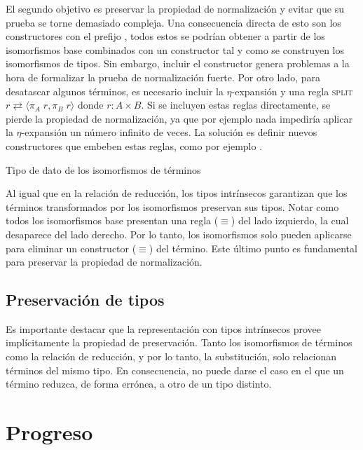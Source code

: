 El segundo objetivo es preservar la propiedad de normalización y evitar que su prueba se torne demasiado compleja.
Una consecuencia directa de esto son los constructores con el prefijo , todos estos se podrían obtener a partir de los isomorfismos base combinados con un constructor  tal y como se construyen los isomorfismos de tipos.
Sin embargo, incluir el constructor  genera problemas a la hora de formalizar la prueba de normalización fuerte.
Por otro lado, para desatascar algunos términos, es necesario incluir la $\eta$-expansión y una regla \textsc{split} $r \rightleftarrows \langle \pi_A\; r , \pi_B\; r \rangle$ donde $r: A \times B$.
Si se incluyen estas reglas directamente, se pierde la propiedad de normalización, ya que por ejemplo nada impediría aplicar la $\eta$-expansión un número infinito de veces.
La solución es definir nuevos constructores que embeben estas reglas, como por ejemplo .


\begin{codigo}
	Tipo de dato de los isomorfismos de términos
	
\end{codigo}

Al igual que en la relación de reducción, los tipos intrínsecos garantizan que los términos transformados por los isomorfismos preservan sus tipos.
Notar como todos los isomorfismos base presentan una regla ($\equiv$) del lado izquierdo, la cual desaparece del lado derecho.
Por lo tanto, los isomorfismos solo pueden aplicarse para eliminar un constructor ($\equiv$) del término.
Este último punto es fundamental para preservar la propiedad de normalización.


\subsection{Preservación de tipos}

Es importante destacar que la representación con tipos intrínsecos provee implícitamente la propiedad de preservación.
Tanto los isomorfismos de términos como la relación de reducción, y por lo tanto, la substitución, solo relacionan términos del mismo tipo.
En consecuencia, no puede darse el caso en el que un término reduzca, de forma errónea, a otro de un tipo distinto.


\section{Progreso}

